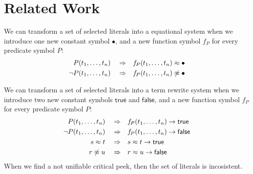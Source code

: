
\chapter{Related Work}


We can transform a set of selected literals into a equational system 
when we introduce one new constant symbol $\bullet$,
and a new function symbol $f\!_P$ for every predicate symbol $P$:
\begin{align*}
	P(t_1,\ldots,t_n) \quad\Rightarrow&\quad f\!_P(t_1,\ldots,t_n) \approx \bullet \\ 
	\lnot P(t_1,\ldots,t_n) \quad\Rightarrow&\quad f\!_P(t_1,\ldots,t_n) \not\approx \bullet
\end{align*}


We can transform a set of selected literals into a term rewrite system 
when we introduce two new constant symbols $\mathsf{true}$ and $\mathsf{false}$,
and a new function symbol $f\!_P$ for every predicate symbol $P$:
\begin{align*}
P(t_1,\ldots,t_n) \quad\Rightarrow &\quad f\!_P(t_1,\ldots,t_n) \rightarrow \mathsf{true} 
\\ 
\lnot P(t_1,\ldots,t_n) \quad\Rightarrow &\quad f\!_P(t_1,\ldots,t_n) \rightarrow \mathsf{false} 
\\
s \approx t \quad\Rightarrow&\quad s \approx t\rightarrow \mathsf{true} 
\\ 
r \not\approx u \quad\Rightarrow&\quad r \approx u\rightarrow  \mathsf{false}
\end{align*}
When we find a not unifiable critical peek, then the set of literals is incosistent.




